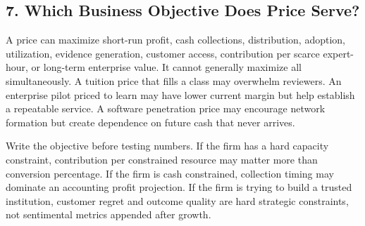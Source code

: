 \subsection*{7. Which Business Objective Does Price Serve?}

A price can maximize short-run profit, cash collections, distribution, adoption, utilization, evidence generation, customer access, contribution per scarce expert-hour, or long-term enterprise value. It cannot generally maximize all simultaneously. A tuition price that fills a class may overwhelm reviewers. An enterprise pilot priced to learn may have lower current margin but help establish a repeatable service. A software penetration price may encourage network formation but create dependence on future cash that never arrives.

Write the objective before testing numbers. If the firm has a hard capacity constraint, contribution per constrained resource may matter more than conversion percentage. If the firm is cash constrained, collection timing may dominate an accounting profit projection. If the firm is trying to build a trusted institution, customer regret and outcome quality are hard strategic constraints, not sentimental metrics appended after growth.

